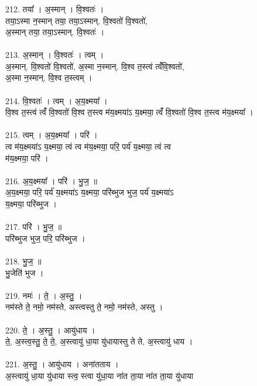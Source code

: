 \subsubsection{}
212. तया᳚ । अ॒स्मान् । वि॒श्वतः॑ ।\\
तया॒ऽस्मा न॒स्मान् तया॒ तया॒ऽस्मान्. वि॒श्वतो॑ वि॒श्वतो॑,\\
अ॒स्मान् तया॒ तया॒ऽस्मान्. वि॒श्वतः॑ ।\\
\\
213. अ॒स्मान् । वि॒श्वतः॑ । त्वम् ।\\
अ॒स्मान्. वि॒श्वतो॑ वि॒श्वतो॑, अ॒स्मा न॒स्मान्. वि॒श्व त॒स्त्वं त्वंँवि॒श्वतो॑,\\
अ॒स्मा न॒स्मान्. वि॒श्व त॒स्त्वम् ।\\
\\
214. वि॒श्वतः॑ । त्वम् । अ॒य॒क्ष्मया᳚ ।\\
वि॒श्व त॒स्त्वं त्वंँ वि॒श्वतो॑ वि॒श्व त॒स्त्व म॑य॒क्ष्मया॑ऽ य॒क्ष्मया॒ त्वंँ वि॒श्वतो॑ वि॒श्व त॒स्त्व म॑य॒क्ष्मया᳚ ।\\
\\
215. त्वम् । अ॒य॒क्ष्मया᳚ । परि॑ ।\\
त्व म॑य॒क्ष्मया॑ऽ य॒क्ष्मया॒ त्वं त्व म॑य॒क्ष्मया॒ परि॒ पर्य॑ य॒क्ष्मया॒ त्वं त्व\\
म॑य॒क्ष्मया॒ परि॑ ।\\
\\
216. अ॒य॒क्ष्मया᳚ । परि॑ । भु॒ज॒ ॥\\
अ॒य॒क्ष्मया॒ परि॒ पर्य॑ य॒क्ष्मया॑ऽ य॒क्ष्मया॒ परि॑ब्भुज भुज॒ पर्य॑ य॒क्ष्मया॑ऽ\\
य॒क्ष्मया॒ परि॑ब्भुज ।\\
\\
217. परि॑ । भु॒ज॒ ॥\\
परि॑ब्भुज भुज॒ परि॒ परि॑ब्भुज ।\\
\\
218. भु॒ज॒ ॥\\
भु॒जेति॑ भुज ।\\
\\
219. नमः॑ । ते॒ । अ॒स्तु॒ ।\\
नम॑स्ते ते॒ नमो॒ नम॑स्ते, अस्त्वस्तु ते॒ नमो॒ नम॑स्ते, अस्तु ।\\
\\
220. ते॒ । अ॒स्तु॒ । आयु॑धाय ।\\
ते॒, अ॒स्त्व॒स्तु॒ ते॒ ते॒, अ॒स्त्वायु॑ धा॒या यु॑धायास्तु ते ते, अ॒स्त्वायु॑ धाय ।\\
\\
221. अ॒स्तु॒ । आयु॑धाय । अना॑तताय ।\\
अ॒स्त्वायु॑ धा॒या यु॑धाया स्त्व॒ स्त्वा यु॑धा॒या ना॑त ता॒या ना॑त ता॒या यु॑धाया\\
